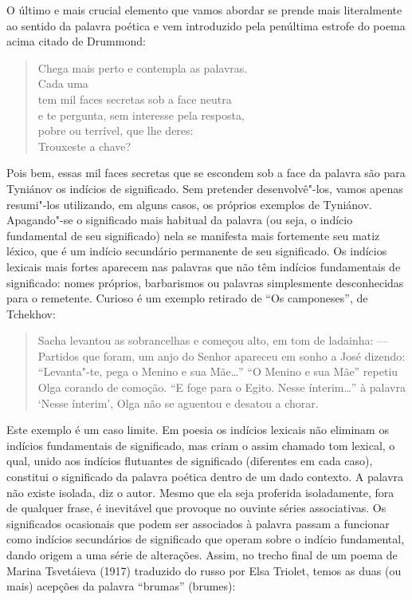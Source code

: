 O último e mais crucial elemento que vamos abordar se prende mais
literalmente ao sentido da palavra poética e vem introduzido pela
penúltima estrofe do poema acima citado de Drummond:

\begin{verse}
Chega mais perto e contempla as palavras. \\
Cada uma \\
tem mil faces secretas sob a face neutra \\
e te pergunta, sem interesse pela resposta, \\
pobre ou terrível, que lhe deres: \\
Trouxeste a chave?
\end{verse}

Pois bem, essas mil faces secretas que se escondem sob a face da
palavra são para Tyniánov os indícios de significado. Sem pretender
desenvolvê"-los, vamos apenas resumi"-los utilizando, em alguns casos, os
próprios exemplos de Tyniánov. Apagando"-se o significado mais habitual
da palavra (ou seja, o indício fundamental de seu significado) nela se
manifesta mais fortemente seu matiz léxico, que é um indício secundário
permanente de seu significado. Os indícios lexicais mais fortes aparecem
nas palavras que não têm indícios fundamentais de significado: nomes
próprios, barbarismos ou palavras simplesmente desconhecidas para o
remetente. Curioso é um exemplo retirado de ``Os camponeses'', de
Tchekhov:

\begin{quote}
Sacha levantou as sobrancelhas e começou alto, em tom de ladainha: ---
Partidos que foram, um anjo do Senhor apareceu em sonho a José dizendo:
``Levanta"-te, pega o Menino e sua Mãe\ldots{}'' ``O Menino e sua Mãe'' repetiu
Olga corando de comoção. ``E foge para o Egito. Nesse ínterim\ldots{}'' à
palavra `Nesse ínterim', Olga não se aguentou e desatou a chorar.
\end{quote}

Este exemplo é um caso limite. Em poesia os indícios lexicais não
eliminam os indícios fundamentais de significado, mas criam o assim
chamado tom lexical, o qual, unido aos indícios flutuantes de
significado (diferentes em cada caso), constitui o significado da
palavra poética dentro de um dado contexto. A palavra não existe
isolada, diz o autor. Mesmo que ela seja proferida isoladamente, fora de
qualquer frase, é inevitável que provoque no ouvinte séries
associativas. Os significados ocasionais que podem ser associados à
palavra passam a funcionar como indícios secundários de significado que
operam sobre o indício fundamental, dando origem a uma série de
alterações. Assim, no trecho final de um poema de Marina Tsvetáieva
(1917) traduzido do russo por Elsa Triolet, temos as duas (ou mais) acepções da
palavra ``brumas'' (brumes):

